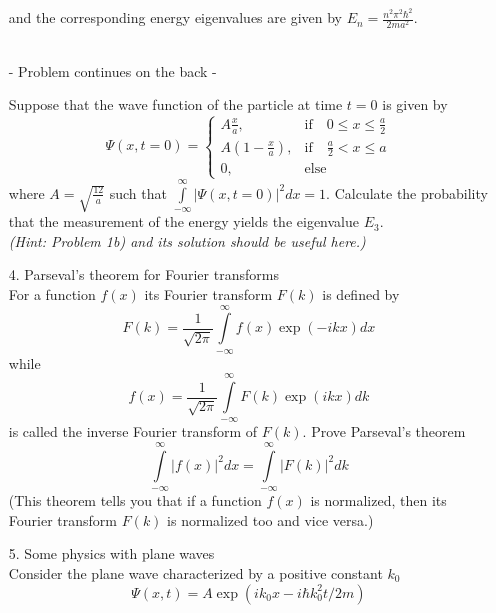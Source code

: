 \documentclass[11pt]{article}
\begin{document}
\begin{itemize}
\begin{displaymath}
\end{displaymath}
and the corresponding energy eigenvalues are given by $E_n =\frac{n^2\pi^2\hbar^2}{2ma^2}$.
\\ \\
%
\centerline{- Problem continues on the back -}
\newpage
%
Suppose that the wave function of the particle at time $t=0$ is given by
\begin{displaymath}
\Psi(x,t=0) =
\begin{cases}
A\frac{x}{a}, &\mbox{if}\quad 0\le x\le \frac{a}{2}\\
A\left(1-\frac{x}{a}\right), &\mbox{if}\quad \frac{a}{2} < x \le a\\
0, &\mbox{else}
\end{cases}
\end{displaymath}
where $A = \sqrt{\frac{12}{a}}$ such that $\int\limits_{-\infty}^{\infty} |\Psi(x,t=0)|^2 dx = 1$. Calculate the probability that the measurement of the energy yields the eigenvalue $E_3$.\\
{\it (Hint: Problem 1b) and its solution should be useful here.)}
%
\vspace*{0.25cm}
%
\item[4.] Parseval's theorem for Fourier transforms\\
For a function $f(x)$ its Fourier transform $F(k)$ is defined by
\begin{displaymath}
F(k) = \frac{1}{\sqrt{2\pi}}\int\limits_{-\infty}^{\infty}f(x)\exp(-ikx) dx
\end{displaymath}
while
\begin{displaymath}
f(x) = \frac{1}{\sqrt{2\pi}}\int\limits_{-\infty}^{\infty}F(k)\exp(ikx) dk
\end{displaymath}
is called the inverse Fourier transform of $F(k)$.
Prove Parseval's theorem
\begin{displaymath}
\int\limits_{-\infty}^{\infty} |f(x)|^2 dx = \int\limits_{-\infty}^{\infty} |F(k)|^2 dk
\end{displaymath}
(This theorem tells you that if a function $f(x)$ is normalized, then its Fourier transform $F(k)$ is normalized too and vice versa.)
%
\vspace*{0.25cm}
%
\item[5.] Some physics with plane waves\\
Consider the plane wave characterized by a positive constant $k_0$
\begin{equation}\label{plane}
\Psi(x,t) = A \exp(ik_0x-i\hbar k_0^2t/2m)
\end{equation}

\end{itemize}
\end{document}
